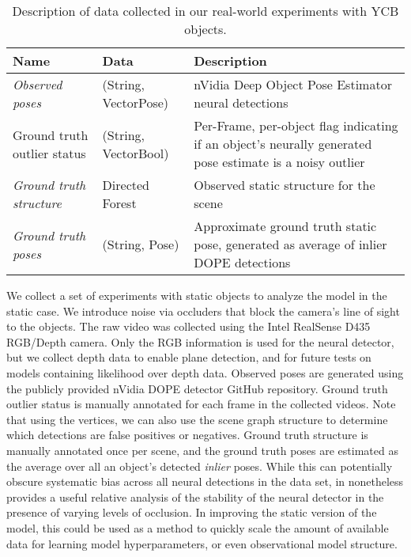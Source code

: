 \begin{table}
\begin{tabular}{|p{2.5cm}|p{4cm}|p{7.5cm}|}
\hline
\textbf{Name}               & \textbf{Data}          & \textbf{Description} \\
\hline
\textit{Observed poses}              & (String, Vector{Pose}) & nVidia Deep Object Pose Estimator neural detections \\
\hline
Ground truth outlier status & (String, Vector{Bool}) & Per-Frame, per-object flag indicating if an object's neurally generated pose estimate is a noisy outlier \\
\hline
\textit{Ground truth structure}      & Directed Forest        & Observed static structure for the scene  \\
\hline
\textit{Ground truth poses}          & (String, Pose)         & Approximate ground truth static pose, generated as average of inlier DOPE detections \\
\hline
\end{tabular}
\caption{Description of data collected in our real-world experiments with YCB objects.}
\end{table}

We collect a set of experiments with static objects to analyze the model in the static case.
We introduce noise via occluders that block the camera's line of sight to the objects.
The raw video was collected using the Intel RealSense D435 RGB/Depth camera.
Only the RGB information is used for the neural detector, but we collect depth data to enable plane detection, and for future tests on models containing likelihood over depth data.
Observed poses are generated using the publicly provided nVidia DOPE detector GitHub repository.
Ground truth outlier status is manually annotated for each frame in the collected videos.
Note that using the vertices, we can also use the scene graph structure to determine which detections are false positives or negatives.
Ground truth structure is manually annotated once per scene, and the ground truth poses are estimated as the average over all an object's detected \textit{inlier} poses.
While this can potentially obscure systematic bias across all neural detections in the data set, in nonetheless provides a useful relative analysis of the stability of the neural detector in the presence of varying levels of occlusion.
In improving the static version of the model, this could be used as a method to quickly scale the amount of available data for learning model hyperparameters, or even observational model structure.


